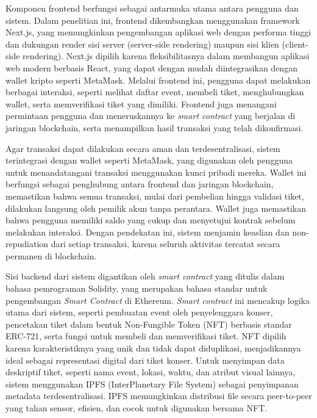 Komponen frontend berfungsi sebagai antarmuka utama antara pengguna dan sistem.
Dalam penelitian ini, frontend dikembangkan menggunakan framework Next.js, yang
memungkinkan pengembangan aplikasi web dengan performa tinggi dan dukungan
render sisi server (server-side rendering) maupun sisi klien (client-side
rendering). Next.js dipilih karena fleksibilitasnya dalam membangun aplikasi
web modern berbasis React, yang dapat dengan mudah diintegrasikan dengan wallet
kripto seperti MetaMask. Melalui frontend ini, pengguna dapat melakukan
berbagai interaksi, seperti melihat daftar event, membeli tiket, menghubungkan
wallet, serta memverifikasi tiket yang dimiliki. Frontend juga menangani
permintaan pengguna dan meneruskannya ke \emph{smart contract} yang berjalan di
jaringan blockchain, serta menampilkan hasil transaksi yang telah dikonfirmasi.

Agar transaksi dapat dilakukan secara aman dan terdesentralisasi, sistem
terintegrasi dengan wallet seperti MetaMask, yang digunakan oleh pengguna untuk
menandatangani transaksi menggunakan kunci pribadi mereka. Wallet ini berfungsi
sebagai penghubung antara frontend dan jaringan blockchain, memastikan bahwa
semua transaksi, mulai dari pembelian hingga validasi tiket, dilakukan langsung
oleh pemilik akun tanpa perantara. Wallet juga memastikan bahwa pengguna
memiliki saldo yang cukup dan menyetujui kontrak sebelum melakukan interaksi.
Dengan pendekatan ini, sistem menjamin keaslian dan non-repudiation dari setiap
transaksi, karena seluruh aktivitas tercatat secara permanen di blockchain.

Sisi backend dari sistem digantikan oleh \emph{smart contract} yang ditulis
dalam bahasa pemrograman Solidity, yang merupakan bahasa standar untuk
pengembangan \emph{Smart Contract} di Ethereum. \emph{Smart contract} ini
mencakup logika utama dari sistem, seperti pembuatan event oleh penyelenggara
konser, pencetakan tiket dalam bentuk Non-Fungible Token (NFT) berbasis standar
ERC-721, serta fungsi untuk membeli dan memverifikasi tiket. NFT dipilih karena
karakteristiknya yang unik dan tidak dapat diduplikasi, menjadikannya ideal
sebagai representasi digital dari tiket konser. Untuk menyimpan data deskriptif
tiket, seperti nama event, lokasi, waktu, dan atribut visual lainnya, sistem
menggunakan IPFS (InterPlanetary File System) sebagai penyimpanan metadata
terdesentralisasi. IPFS memungkinkan distribusi file secara peer-to-peer yang
tahan sensor, efisien, dan cocok untuk digunakan bersama NFT.

